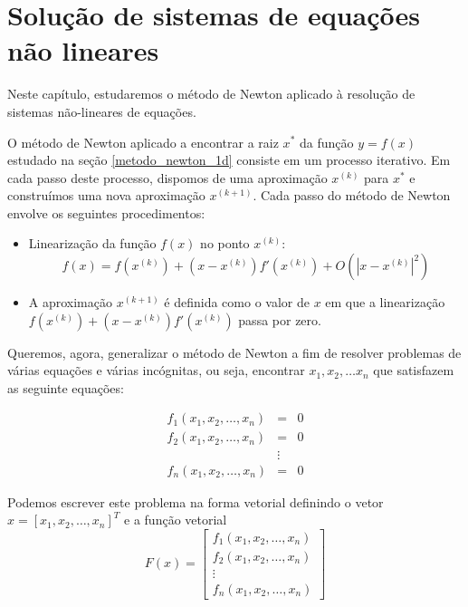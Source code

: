 
%

\chapter{Solução de sistemas de equações não lineares}
Neste capítulo, estudaremos o método de Newton aplicado à resolução de sistemas não-lineares de equações.

O método de Newton aplicado a encontrar a raiz $x^*$ da função $y=f(x)$ estudado na seção \ref{metodo_newton_1d} consiste em um processo iterativo. Em cada passo deste processo, dispomos de uma aproximação $x^{(k)}$ para $x^*$ e construímos uma nova aproximação $x^{(k+1)}$.  Cada passo do método de Newton envolve os seguintes procedimentos:
\begin{itemize}
\item Linearização da função $f(x)$ no ponto $x^{(k)}$: 
  \begin{equation*}
    f(x)= f(x^{(k)})+ (x-x^{(k)}) f'(x^{(k)}) + O\left(|x-x^{(k)}|^2\right)    
  \end{equation*}
\item A aproximação $x^{(k+1)}$ é definida como o valor de $x$ em que a linearização $f(x^{(k)})+ (x-x^{(k)}) f'(x^{(k)})$ passa por zero.
\end{itemize}


Queremos, agora, generalizar o método de Newton a fim de resolver problemas de várias equações e várias incógnitas, ou seja, encontrar $x_1,x_2,\ldots x_n$ que satisfazem as seguinte equações:

\begin{eqnarray*}
f_1(x_1,x_2,\ldots,x_n)&=&0\\
f_2(x_1,x_2,\ldots,x_n)&=&0\\
&\vdots&\\
f_n(x_1,x_2,\ldots,x_n)&=&0
\end{eqnarray*}

Podemos escrever este problema na forma vetorial definindo o vetor $x=[x_1,x_2,\ldots,x_n]^T$ e a função vetorial
$$F(x)=\left[
\begin{array}{c}
f_1(x_1,x_2,\ldots,x_n)\\
f_2(x_1,x_2,\ldots,x_n)\\
\vdots\\
f_n(x_1,x_2,\ldots,x_n)
\end{array}
\right]$$

